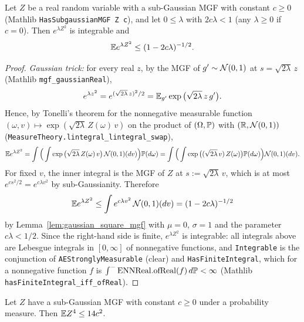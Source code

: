 \begin{lemma}
\label{lem:subgaussian_square_mgf_pos}
\leanok
{}
Let $Z$ be a real random variable with a sub-Gaussian MGF with constant $c \ge 0$
(Mathlib \texttt{HasSubgaussianMGF Z c}), and let $0 \le \lambda$ with $2c\lambda < 1$
(any $\lambda \ge 0$ if $c = 0$). Then $e^{\lambda Z^2}$ is integrable and
\[
  \mathbb{E} e^{\lambda Z^2} \le (1 - 2c\lambda)^{-1/2}.
\]
\end{lemma}

\begin{proof}
\leanok
{}
\emph{Gaussian trick:} for every real $z$, by the MGF of $g' \sim \mathcal{N}(0,1)$ at
$s = \sqrt{2\lambda}\,z$ (Mathlib \texttt{mgf\_gaussianReal}),
\[
  e^{\lambda z^2} = e^{(\sqrt{2\lambda}\,z)^2/2} = \mathbb{E}_{g'}\exp\big(\sqrt{2\lambda}\,z\,g'\big).
\]
Hence, by Tonelli's theorem for the nonnegative measurable function
$(\omega, v) \mapsto \exp(\sqrt{2\lambda}\,Z(\omega)\,v)$ on the product of $(\Omega,\mathbb{P})$
with $(\mathbb{R}, \mathcal{N}(0,1))$ (\texttt{MeasureTheory.lintegral\_lintegral\_swap}),
\[
  \mathbb{E} e^{\lambda Z^2} = \int\Big(\int\exp\big(\sqrt{2\lambda}\,Z(\omega)\,v\big)\,\mathcal{N}(0,1)(dv)\Big)\mathbb{P}(d\omega)
  = \int\Big(\int\exp\big((\sqrt{2\lambda}\,v)\,Z(\omega)\big)\mathbb{P}(d\omega)\Big)\mathcal{N}(0,1)(dv).
\]
For fixed $v$, the inner integral is the MGF of $Z$ at $s := \sqrt{2\lambda}\,v$, which is at
most $e^{cs^2/2} = e^{c\lambda v^2}$ by sub-Gaussianity. Therefore
\[
  \mathbb{E} e^{\lambda Z^2} \le \int e^{c\lambda v^2}\,\mathcal{N}(0,1)(dv) = (1 - 2c\lambda)^{-1/2}
\]
by Lemma~\ref{lem:gaussian_square_mgf} with $\mu = 0$, $\sigma = 1$ and the parameter
$c\lambda < 1/2$. Since the right-hand side is finite, $e^{\lambda Z^2}$ is integrable: all
integrals above are Lebesgue integrals in $[0,\infty]$ of nonnegative functions, and
\texttt{Integrable} is the conjunction of \texttt{AEStronglyMeasurable} (clear) and
\texttt{HasFiniteIntegral}, which for a nonnegative function $f$ is
$\int^-\mathrm{ENNReal.ofReal}(f)\,d\mathbb{P} < \infty$ (Mathlib \texttt{hasFiniteIntegral\_iff\_ofReal}).
\end{proof}

\begin{lemma}\label{lem:subgaussian_fourth_moment}
\leanok
Let $Z$ have a sub-Gaussian MGF with constant $c \ge 0$ under a probability measure. Then
$\mathbb{E} Z^4 \le 14c^2$.
\end{lemma}

